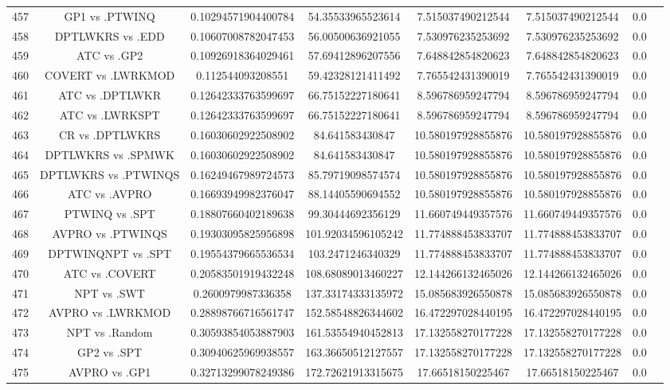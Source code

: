 \documentclass[a3paper,10pt]{article}
\begin{document}
\begin{table}[!htp]
\begin{tabular}{cccccccc}
457&GP1 vs .PTWINQ&0.10294571904400784&54.35533965523614&7.515037490212544&7.515037490212544&0.0\\
458&DPTLWKRS vs .EDD&0.10607008782047453&56.00500636921055&7.530976235253692&7.530976235253692&0.0\\
459&ATC vs .GP2&0.10926918364029461&57.69412896207556&7.648842854820623&7.648842854820623&0.0\\
460&COVERT vs .LWRKMOD&0.112544093208551&59.42328121411492&7.765542431390019&7.765542431390019&0.0\\
461&ATC vs .DPTLWKR&0.12642333763599697&66.75152227180641&8.596786959247794&8.596786959247794&0.0\\
462&ATC vs .LWRKSPT&0.12642333763599697&66.75152227180641&8.596786959247794&8.596786959247794&0.0\\
463&CR vs .DPTLWKRS&0.16030602922508902&84.641583430847&10.580197928855876&10.580197928855876&0.0\\
464&DPTLWKRS vs .SPMWK&0.16030602922508902&84.641583430847&10.580197928855876&10.580197928855876&0.0\\
465&DPTLWKRS vs .PTWINQS&0.16249467989724573&85.79719098574574&10.580197928855876&10.580197928855876&0.0\\
466&ATC vs .AVPRO&0.16693949982376047&88.14405590694552&10.580197928855876&10.580197928855876&0.0\\
467&PTWINQ vs .SPT&0.18807660402189638&99.30444692356129&11.660749449357576&11.660749449357576&0.0\\
468&AVPRO vs .PTWINQS&0.19303095825956898&101.92034596105242&11.774888453833707&11.774888453833707&0.0\\
469&DPTWINQNPT vs .SPT&0.19554379665536534&103.2471246340329&11.774888453833707&11.774888453833707&0.0\\
470&ATC vs .COVERT&0.20583501919432248&108.68089013460227&12.144266132465026&12.144266132465026&0.0\\
471&NPT vs .SWT&0.2600979987336358&137.33174333135972&15.085683926550878&15.085683926550878&0.0\\
472&AVPRO vs .LWRKMOD&0.28898766716561747&152.58548826344602&16.472297028440195&16.472297028440195&0.0\\
473&NPT vs .Random&0.30593854053887903&161.53554940452813&17.132558270177228&17.132558270177228&0.0\\
474&GP2 vs .SPT&0.30940625969938557&163.36650512127557&17.132558270177228&17.132558270177228&0.0\\
475&AVPRO vs .GP1&0.32713299078249386&172.72621913315675&17.66518150225467&17.66518150225467&0.0\\

\end{tabular}
\end{table}
\end{document}

